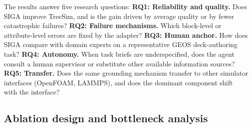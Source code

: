 \documentclass{article}
\begin{document}
The results answer five research questions:
\textbf{RQ1: Reliability and quality.} Does SIGA improve TreeSim, and is the gain driven by average quality or by fewer catastrophic failures?
\textbf{RQ2: Failure mechanisms.} Which block-level or attribute-level errors are fixed by the adapter?
\textbf{RQ3: Human anchor.} How does SIGA compare with domain experts on a representative GEOS deck-authoring task?
\textbf{RQ4: Autonomy.} When task briefs are underspecified, does the agent consult a human supervisor or substitute other available information sources?
\textbf{RQ5: Transfer.} Does the same grounding mechanism transfer to other simulator interfaces (OpenFOAM, LAMMPS), and does the dominant component shift with the interface?






\subsection{Ablation design and bottleneck analysis}
\label{subsec:cells}
\end{document}

